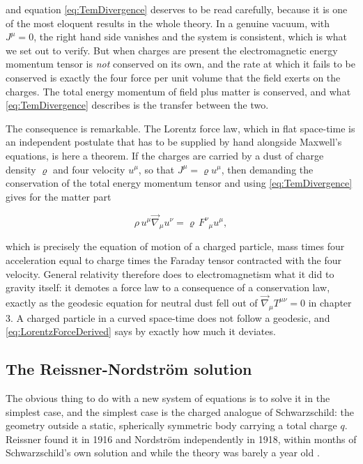         and equation \ref{eq:TemDivergence} deserves to be read carefully, because it is one of the most eloquent results in the whole theory. In a genuine vacuum, with $J^{\mu}=0$, the right hand side vanishes and the system is consistent, which is what we set out to verify. But when charges are present the electromagnetic energy momentum tensor is \textit{not} conserved on its own, and the rate at which it fails to be conserved is exactly the four force per unit volume that the field exerts on the charges. The total energy momentum of field plus matter is conserved, and what \ref{eq:TemDivergence} describes is the transfer between the two.

        The consequence is remarkable. The Lorentz force law, which in flat space-time is an independent postulate that has to be supplied by hand alongside Maxwell's equations, is here a theorem. If the charges are carried by a dust of charge density $\varrho$ and four velocity $u^{\mu}$, so that $J^{\mu}=\varrho u^{\mu}$, then demanding the conservation of the total energy momentum tensor and using \ref{eq:TemDivergence} gives for the matter part

        \begin{equation}\label{eq:LorentzForceDerived}
            \rho\,u^{\mu}\Vec{\nabla}_{\mu}u^{\nu} = \varrho\,F^{\nu}_{\;\;\mu}u^{\mu},
        \end{equation}

        which is precisely the equation of motion of a charged particle, mass times four acceleration equal to charge times the Faraday tensor contracted with the four velocity. General relativity therefore does to electromagnetism what it did to gravity itself: it demotes a force law to a consequence of a conservation law, exactly as the geodesic equation for neutral dust fell out of $\Vec{\nabla}_{\mu}T^{\mu\nu}=0$ in chapter 3. A charged particle in a curved space-time does not follow a geodesic, and \ref{eq:LorentzForceDerived} says by exactly how much it deviates.

    \subsection{The Reissner-Nordström solution}

        The obvious thing to do with a new system of equations is to solve it in the simplest case, and the simplest case is the charged analogue of Schwarzschild: the geometry outside a static, spherically symmetric body carrying a total charge $q$. Reissner found it in 1916 and Nordström independently in 1918, within months of Schwarzschild's own solution and while the theory was barely a year old \citep{reissner1916,nordstrom1918}.

